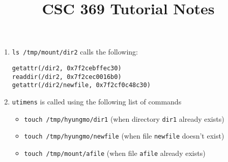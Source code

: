 \documentclass[12pt]{article}
\begin{document}
\title{CSC 369 Tutorial Notes}

\begin{enumerate}[1.]
    \item \texttt{ls /tmp/mount/dir2} calls the following:

    \bigskip

    \texttt{getattr(/dir2, 0x7f2cebffec30)}\\
    \texttt{readdir(/dir2, 0x7f2cec0016b0)}\\
    \texttt{getattr(/dir2/newfile, 0x7f2cf0c48c30)}

    \item \texttt{utimens} is called using the following list of commands

    \begin{itemize}
        \item \texttt{touch /tmp/hyungmo/dir1} (when directory \texttt{dir1} already exists)
        \item \texttt{touch /tmp/hyungmo/newfile} (when file \texttt{newfile} doesn't exist)
        \item \texttt{touch /tmp/mount/afile} (when file \texttt{afile} already exists)
    \end{itemize}
\end{enumerate}
\end{document}
